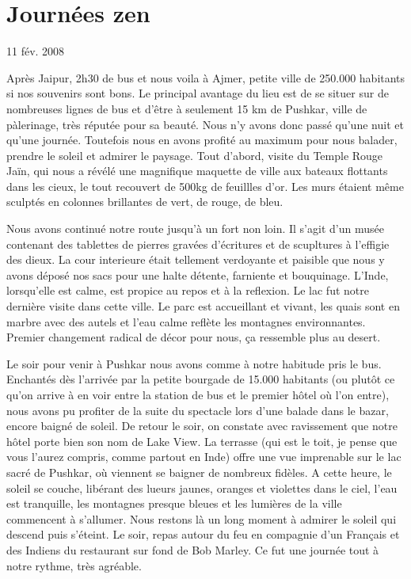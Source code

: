 \section{Journées zen}

11 fév. 2008

\begin{multicols}{2}

Après Jaipur, 2h30 de bus et nous voila à Ajmer, petite ville de 250.000 habitants si nos souvenirs sont bons. Le principal avantage du lieu est de se situer sur de nombreuses lignes de bus et d'être à seulement 15 km de Pushkar, ville de pàlerinage, très réputée pour sa beauté. Nous n'y avons donc passé qu'une nuit et qu'une journée. Toutefois nous en avons profité au maximum pour nous balader, prendre le soleil et admirer le paysage. Tout d'abord, visite du Temple Rouge Jaïn, qui nous a révélé une magnifique maquette de ville aux bateaux flottants dans les cieux, le tout recouvert de 500kg de feuillles d'or. Les murs étaient même sculptés en colonnes brillantes de vert, de rouge, de bleu.

Nous avons continué notre route jusqu'à un fort non loin. Il s'agit d'un musée contenant des tablettes de pierres gravées d'écritures et de scupltures à l'effigie des dieux. La cour interieure était tellement verdoyante et paisible que nous y avons déposé nos sacs pour une halte détente, farniente et bouquinage. L'Inde, lorsqu'elle est calme, est propice au repos et à la reflexion. Le lac fut notre dernière visite dans cette ville. Le parc est accueillant et vivant, les quais sont en marbre avec des autels et l'eau calme reflète les montagnes environnantes. Premier changement radical de décor pour nous, ça ressemble plus au desert.

Le soir pour venir à Pushkar nous avons comme à notre habitude pris le bus. Enchantés dès l'arrivée par la petite bourgade de 15.000 habitants (ou plutôt ce qu'on arrive à en voir entre la station de bus et le premier hôtel où l'on entre), nous avons pu profiter de la suite du spectacle lors d'une balade dans le bazar, encore baigné de soleil. De retour le soir, on constate avec ravissement que notre hôtel porte bien son nom de Lake View. La terrasse (qui est le toit, je pense que vous l'aurez compris, comme partout en Inde) offre une vue imprenable sur le lac sacré de Pushkar, où viennent se baigner de nombreux fidèles. A cette heure, le soleil se couche, libérant des lueurs jaunes, oranges et violettes dans le ciel, l'eau est tranquille, les montagnes presque bleues et les lumières de la ville commencent à s'allumer. Nous restons là un long moment à admirer le soleil qui descend puis s'éteint. Le soir, repas autour du feu en compagnie d'un Français et des Indiens du restaurant sur fond de Bob Marley. Ce fut une journée tout à notre rythme, très agréable.


\end{multicols}
